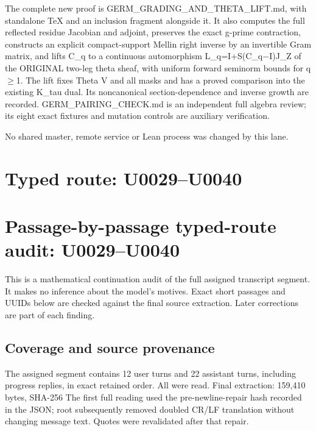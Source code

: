 The complete new proof is GERM\_GRADING\_AND\_THETA\_LIFT.md, with
standalone TeX and an inclusion fragment alongside it. It also computes
the full reflected residue Jacobian and adjoint, preserves the exact
g-prime contraction, constructs an explicit compact-support Mellin right
inverse by an invertible Gram matrix, and lifts C\_q to a continuous
automorphism L\_q=I+S(C\_q\allowbreak{}\ensuremath{−}\allowbreak{}I)J\_Z
of the ORIGINAL two-leg theta sheaf, with uniform forward seminorm
bounds for q\allowbreak{}\ensuremath{≥}\allowbreak{}1. The lift fixes
Theta V and all masks and has a proved comparison into the existing
K\_tau dual. Its noncanonical section-dependence and inverse growth are
recorded. GERM\_PAIRING\_CHECK.md is an independent full algebra review;
its eight exact fixtures and mutation controls are auxiliary
verification.

No shared master, remote service or Lean process was changed by this
lane.

\clearpage

\section{Typed route: U0029--U0040}\label{TranscriptLedgerStage:typed-route-u0029u0040}

\section{Passage-by-passage typed-route audit:
U0029--U0040}\label{TranscriptLedgerStage:passage-by-passage-typed-route-audit-u0029u0040}

This is a mathematical continuation audit of the full assigned
transcript segment. It makes no inference about the model's motives.
Exact short passages and UUIDs below are checked against the final
source extraction. Later corrections are part of each finding.

\subsection{Coverage and source
provenance}\label{TranscriptLedgerStage:coverage-and-source-provenance}

The assigned segment contains 12 user turns and 22 assistant turns,
including progress replies, in exact retained order. All were read.
Final extraction: 159,410 bytes, SHA-256
\protect{}
The first full reading used the pre-newline-repair hash recorded in the
JSON; root subsequently removed doubled CR/LF translation without
changing message text. Quotes were revalidated after that repair.

